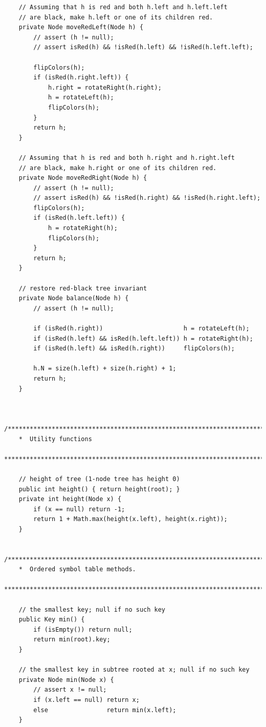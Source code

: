\documentclass{article}
\begin{document}
\begin{lstlisting}
    // Assuming that h is red and both h.left and h.left.left
    // are black, make h.left or one of its children red.
    private Node moveRedLeft(Node h) {
        // assert (h != null);
        // assert isRed(h) && !isRed(h.left) && !isRed(h.left.left);

        flipColors(h);
        if (isRed(h.right.left)) { 
            h.right = rotateRight(h.right);
            h = rotateLeft(h);
            flipColors(h);
        }
        return h;
    }

    // Assuming that h is red and both h.right and h.right.left
    // are black, make h.right or one of its children red.
    private Node moveRedRight(Node h) {
        // assert (h != null);
        // assert isRed(h) && !isRed(h.right) && !isRed(h.right.left);
        flipColors(h);
        if (isRed(h.left.left)) { 
            h = rotateRight(h);
            flipColors(h);
        }
        return h;
    }

    // restore red-black tree invariant
    private Node balance(Node h) {
        // assert (h != null);

        if (isRed(h.right))                      h = rotateLeft(h);
        if (isRed(h.left) && isRed(h.left.left)) h = rotateRight(h);
        if (isRed(h.left) && isRed(h.right))     flipColors(h);

        h.N = size(h.left) + size(h.right) + 1;
        return h;
    }


   /*************************************************************************
    *  Utility functions
    *************************************************************************/

    // height of tree (1-node tree has height 0)
    public int height() { return height(root); }
    private int height(Node x) {
        if (x == null) return -1;
        return 1 + Math.max(height(x.left), height(x.right));
    }

   /*************************************************************************
    *  Ordered symbol table methods.
    *************************************************************************/

    // the smallest key; null if no such key
    public Key min() {
        if (isEmpty()) return null;
        return min(root).key;
    } 

    // the smallest key in subtree rooted at x; null if no such key
    private Node min(Node x) { 
        // assert x != null;
        if (x.left == null) return x; 
        else                return min(x.left); 
    } 


\end{lstlisting}
\end{document}
